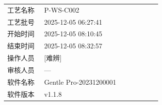 \documentclass[UTF8,10pt,a4paper,fontset=fandol]{ctexart}
\newcommand{\fieldvalue}[1]{#1}
\newcommand{\handwritten}[1]{#1}
\begin{document}
\begin{tabular}{@{}p{0.22\linewidth}p{0.70\linewidth}@{}}
工艺名称 &
\fieldvalue{P-WS-C002}
\\[2pt]
工艺批号 &
\fieldvalue{2025-12-05 06:27:41}
\\[2pt]
开始时间 &
\fieldvalue{2025-12-05 08:10:45}
\\[2pt]
结束时间 &
\fieldvalue{2025-12-05 08:32:57}
\\[2pt]
操作人员 &
\fieldvalue{\handwritten{[难辨]}}
\\[2pt]
审核人员 &
\fieldvalue{---}
\\[2pt]
软件名称 &
\fieldvalue{Gentle Pro-20231200001}
\\[2pt]
软件版本 &
\fieldvalue{v1.1.8}
\end{tabular}

\vspace{1em}
\end{document}
